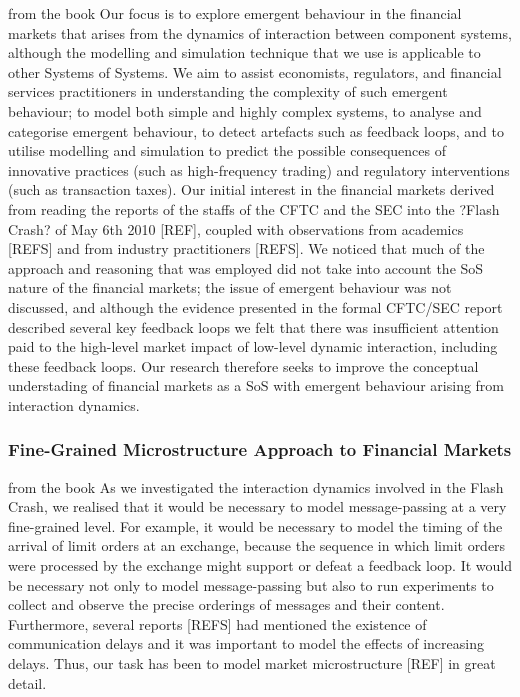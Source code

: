 \documentclass{article}
\begin{document}
from the book
Our focus is to explore emergent behaviour in the financial markets that arises from the dynamics of interaction between component systems, although the modelling and simulation technique that we use is applicable to other Systems of Systems.  We aim to assist economists, regulators, and financial services practitioners in understanding the complexity of such emergent behaviour; to model both simple and highly complex systems, to analyse and categorise emergent behaviour, to detect artefacts such as feedback loops, and to utilise modelling and simulation to predict the possible consequences of innovative practices (such as high-frequency trading) and regulatory interventions (such as transaction taxes).
Our initial interest in the financial markets derived from reading the reports of the staffs of the CFTC and the SEC into the ?Flash Crash? of May 6th 2010 [REF], coupled with observations from academics [REFS] and from industry practitioners [REFS].  We noticed that much of the approach and reasoning that was employed did not take into account the SoS nature of the financial markets; the issue of emergent behaviour was not discussed, and although the evidence presented in the formal CFTC/SEC report described several key feedback loops we felt that there was insufficient attention paid to the high-level market impact of low-level dynamic interaction, including these feedback loops. Our research therefore seeks to improve the conceptual understading of financial markets as a SoS with emergent behaviour arising from interaction dynamics.
	
\subsubsection{Fine-Grained Microstructure Approach to Financial Markets} 

from the book
As we investigated the interaction dynamics involved in the Flash Crash, we realised that it would be necessary to model message-passing at a very fine-grained level.  For example, it would be necessary to model the timing of the arrival of limit orders at an exchange, because the sequence in which limit orders were processed by the exchange might support or defeat a feedback loop.  It would be necessary not only to model message-passing but also to run experiments to collect and observe the precise orderings of messages and their content. Furthermore, several reports [REFS] had mentioned the existence of communication delays and it was important to model the effects of increasing delays.  Thus, our task has been to model market microstructure [REF] in great detail.
\end{document}
